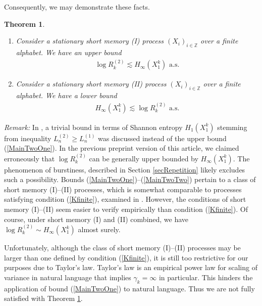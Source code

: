 \documentclass[a4paper,12pt]{article}
\newtheorem{theorem}{Theorem}
\begin{document}
Consequently, we may demonstrate these facts.
\begin{theorem}
  \label{theoMainTwo}
  \mbox{}
  \begin{enumerate}
  \item Consider a stationary short memory (I) process
    $(X_i)_{i\in\mathbb{Z}}$ over a finite alphabet. We have an upper
    bound
  \begin{align}
    \label{MainTwoOne}
    \log R^{(2)}_k\lesssim
    H_\infty(X_1^k)
    \text{ a.s.}
  \end{align}
  \item Consider a stationary short memory (II) process
    $(X_i)_{i\in\mathbb{Z}}$ over a finite alphabet. We have a lower
    bound
  \begin{align}
    \label{MainTwoTwo}
    H_\infty(X_1^k)\lesssim \log R^{(2)}_k
    \text{ a.s.}
  \end{align}
  \end{enumerate}
\end{theorem}
\emph{Remark:} In \citep{Debowski18b,Debowski21}, a trivial bound in
terms of Shannon entropy $H_1(X_1^k)$ stemming from inequality
$L^{(2)}_n\ge L^{(1)}_n$ was discussed instead of the upper bound
(\ref{MainTwoOne}). In the previous preprint version of this article,
we claimed erroneously that $\log R^{(2)}_k$ can be generally upper
bounded by $H_\infty(X_1^k)$. The phenomenon of burstiness, described
in Section \ref{secRepetition} likely excludes such a possibility.
Bounds (\ref{MainTwoOne})--(\ref{MainTwoTwo}) pertain to a class of
short memory (I)--(II) processes, which is somewhat comparable to
processes satisfying condition (\ref{Kfinite}), examined in
\citep{Szpankowski93,Szpankowski93a}. However, the conditions of short
memory (I)--(II) seem easier to verify empirically than condition
(\ref{Kfinite}). Of course, under short memory (I) and (II) combined,
we have $\log R^{(2)}_k\sim H_\infty(X_1^k)$ almost surely.

Unfortunately, although the class of short memory (I)--(II) processes
may be larger than one defined by condition (\ref{Kfinite}), it is
still too restrictive for our purposes due to Taylor's law. Taylor's
law is an empirical power law for scaling of variance in natural
language
\citep{GerlachAltmann14,KobayashiTanakaIshii2018,TanakaIshii21} that
implies $\gamma_k=\infty$ in particular. This hinders the application
of bound (\ref{MainTwoOne}) to natural language. Thus we are not fully
satisfied with Theorem \ref{theoMainTwo}.
\end{document}

